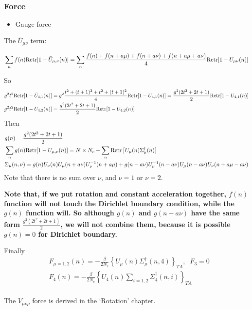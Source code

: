 \subsubsection{\label{sec:forceAcceleration}Force}

\begin{itemize}
  \item Gauge force
\end{itemize}

The $\bar{U}_{\mu\nu}$ term:

\begin{equation}
\begin{split}
&\sum _n f(n){\rm Retr}[1-\bar{U}_{\mu, \nu}(n)]=\sum _n\frac{f(n)+f(n+a\mu)+f(n+a\nu)+f(n+a\mu+a\nu)}{4}{\rm Retr}[1-U_{\mu\nu}(n)]\\
\end{split}
\end{equation}

So
\begin{equation}
\begin{split}
&g^2 t^2 {\rm Retr}[1-\bar{U}_{4,1}(n)]=g^2\frac{t^2 + (t+1)^2 + t^2 + (t+1)^2}{4}{\rm Retr}[1-U_{4,1}(n)]=\frac{g^2(2t^2+2t+1)}{2}{\rm Retr}[1-U_{4,1}(n)]\\
&g^2 t^2 {\rm Retr}[1-\bar{U}_{4,2}(n)]=\frac{g^2(2t^2+2t+1)}{2}{\rm Retr}[1-U_{4,2}(n)]\\
\end{split}
\end{equation}
Then
\begin{equation}
\begin{split}
&g(n)=\frac{g^2(2t^2+2t+1)}{2}\\
&\sum _ng(n){\rm Retr}[1-U_{\mu,\nu}(n)]=N\times N_c-\sum _n {\rm Retr}\left[U_{\mu}(n)\Sigma ^{\dagger}_{\mu}(n)\right]\\
&\Sigma _{\mu}(n,\nu)=g(n)U_{\nu}(n)U_{\mu}(n+a\nu)U^{-1}_{\nu}(n+a\mu)+g(n-a\nu)U^{-1}_{\nu}(n-a\nu)U_{\mu}(n-a\nu)U_{\nu}(n+a\mu-a\nu)\\
\end{split}
\end{equation}
Note that there is no sum over $\nu$, and $\nu=1$ or $\nu=2$.

\textcolor[rgb]{1,0,0}{\textbf{Note that, if we put rotation and constant acceleration together, $f(n)$ function will not touch the Dirichlet boundary condition, while the $g(n)$ function will. So although $g(n)$ and $g(n-a\nu)$ have the same form $\frac{g^2(2t^2+2t+1)}{2}$, we will not combine them, because it is possible $g(n)=0$ for Dirichlet boundary.}}

Finally
\begin{equation}
\begin{split}
&F_{\mu=1,2}(n)=-\frac{\beta}{2N_c}\left\{U_{\mu}(n)\Sigma _{\mu}^{\dagger}(n,4)\right\}_{TA},\;\;F_3=0\\
&F_{4}(n)=-\frac{\beta}{2N_c}\left\{U_{4}(n)\sum _{i=1,2}\Sigma _{4}^{\dagger}(n,i)\right\}_{TA}\\
\end{split}
\end{equation}

The $V_{\mu\nu\rho}$ force is derived in the `Rotation' chapter.

